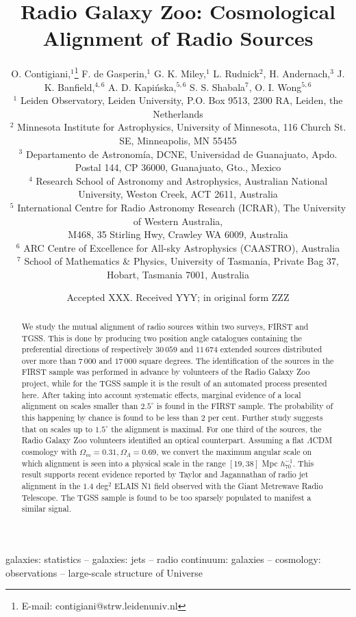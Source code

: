 \documentclass[fleqn,usenatbib]{mnras}
\title[Cosmological Alignment of Radio Sources]{Radio Galaxy Zoo: Cosmological Alignment of Radio Sources}
\author[O. Contigiani et al.]{O. Contigiani,$^{1}$\thanks{E-mail: contigiani@strw.leidenuniv.nl}
F. de Gasperin,$^{1}$
G. K. Miley,$^{1}$ 
L. Rudnick$^{2}$,
H. Andernach,$^{3}$ \newauthor
J. K. Banfield,$^{4, 6}$ 
A. D. Kapi\'nska,$^{5, 6}$
S. S. Shabala$^{7}$,
O. I. Wong$^{5, 6}$
\\
$^{1}$ Leiden  Observatory, Leiden  University,  P.O. Box 9513, 2300 RA,  Leiden,  the Netherlands
\\
$^{2}$ Minnesota Institute for Astrophysics, University of Minnesota,
116 Church St. SE, Minneapolis, MN 55455
\\
$^{3}$ Departamento de Astronom\'ia, DCNE, Universidad de Guanajuato, Apdo.
Postal 144, CP 36000, Guanajuato, Gto., Mexico
\\
$^{4}$ Research School of Astronomy and Astrophysics, Australian National University, Weston Creek, ACT 2611, Australia
\\
$^{5}$ International Centre for Radio Astronomy Research (ICRAR), The University of Western Australia, 
\\
M468, 35 Stirling Hwy, Crawley WA 6009, Australia
\\
$^{6}$ ARC Centre of Excellence for All-sky Astrophysics (CAASTRO), Australia
\\
$^{7}$ School of Mathematics \& Physics, University of Tasmania, Private Bag 37, Hobart, Tasmania 7001, Australia
}
\date{Accepted XXX. Received YYY; in original form ZZZ}
\begin{document}
\label{firstpage}
\pagerange{\pageref{firstpage}--\pageref{lastpage}}
\maketitle

\begin{abstract}
We study the mutual alignment of radio sources within two surveys, FIRST and TGSS. This is done by producing two position angle catalogues containing the preferential directions of respectively $30\,059$ and $11\,674$ extended sources distributed over more than $7\,000$ and $17\,000$ square degrees. 
The identification of the sources in the FIRST sample was performed in advance by volunteers of the Radio Galaxy Zoo project, while for the TGSS sample it is the result of an automated process presented here.
After taking into account systematic effects, marginal evidence of a local alignment on scales smaller than $2.5^\circ$ is found in the FIRST sample. The probability of this happening by chance is found to be less than $2$ per cent. Further study suggests that on scales up to $1.5^\circ$ the alignment is maximal. For one third of the sources, the Radio Galaxy Zoo volunteers identified an optical counterpart. Assuming a flat $\Lambda$CDM cosmology with $\Omega_m = 0.31, \Omega_\Lambda = 0.69$, we convert the maximum angular scale on which alignment is seen into a physical scale in the range $[19, 38]$ Mpc $h_{70}^{-1}$. This result supports recent evidence reported by Taylor and Jagannathan of radio jet alignment in the $1.4$ deg$^2$ ELAIS N1 field observed with the Giant Metrewave Radio Telescope.  The TGSS sample is found to be too sparsely populated to manifest a similar signal.
\end{abstract}

\begin{keywords}
galaxies: statistics -- galaxies: jets -- radio continuum: galaxies -- cosmology: observations -- large-scale structure of Universe
\end{keywords}








	
\end{document}
